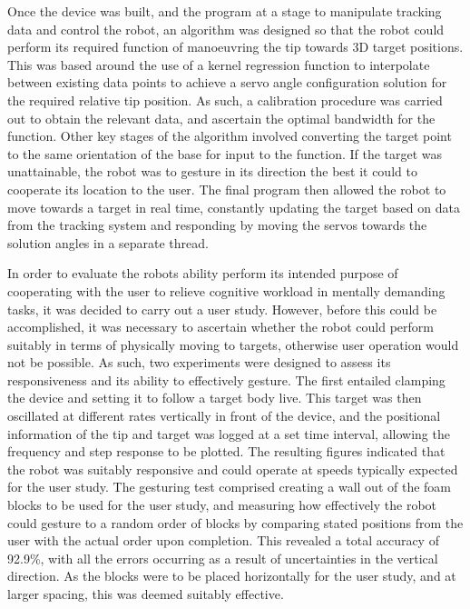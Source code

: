 \documentclass[11pt]{article}
\begin{document}
Once the device was built, and the program at a stage to manipulate tracking data and control the robot, an algorithm was designed so that the robot could perform its required function of manoeuvring the tip towards 3D target positions. This was based around the use of a kernel regression function to interpolate between existing data points to achieve a servo angle configuration solution for the required relative tip position. As such, a calibration procedure was carried out to obtain the relevant data, and ascertain the optimal bandwidth for the function. Other key stages of the algorithm involved converting the target point to the same orientation of the base for input to the function. If the target was unattainable, the robot was to gesture in its direction the best it could to cooperate its location to the user. The final program then allowed the robot to move towards a target in real time, constantly updating the target based on data from the tracking system and responding by moving the servos towards the solution angles in a separate thread. 

In order to evaluate the robots ability perform its intended purpose of cooperating with the user to relieve cognitive workload in mentally demanding tasks, it was decided to carry out a user study. However, before this could be accomplished, it was necessary to ascertain whether the robot could perform suitably in terms of physically moving to targets, otherwise user operation would not be possible. As such, two experiments were designed to assess its responsiveness and its ability to effectively gesture. The first entailed clamping the device and setting it to follow a target body live. This target was then oscillated at different rates vertically in front of the device, and the positional information of the tip and target was logged at a set time interval, allowing the frequency and step response to be plotted. The resulting figures indicated that the robot was suitably responsive and could operate at speeds typically expected for the user study. The gesturing test comprised creating a wall out of the foam blocks to be used for the user study, and measuring how effectively the robot could gesture to a random order of blocks by comparing stated positions from the user with the actual order upon completion. This revealed a total accuracy of 92.9\%, with all the errors occurring as a result of uncertainties in the vertical direction. As the blocks were to be placed horizontally for the user study, and at larger spacing, this was deemed suitably effective.
\end{document}
